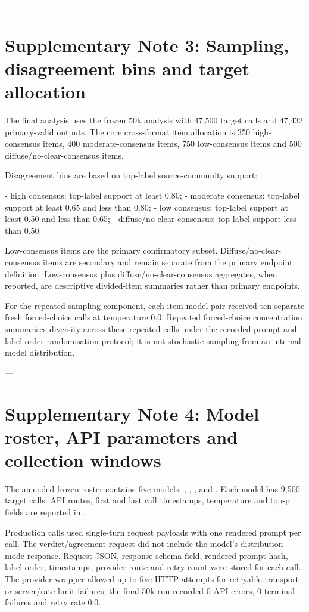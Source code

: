 \documentclass[11pt]{article}
\begin{document}
---

\section{Supplementary Note 3: Sampling, disagreement bins and target allocation}

The final analysis uses the frozen 50k analysis with 47,500 target calls and 47,432 primary-valid outputs. The core cross-format item allocation is 350 high-consensus items, 400 moderate-consensus items, 750 low-consensus items and 500 diffuse/no-clear-consensus items.

Disagreement bins are based on top-label source-community support:

- high consensus: top-label support at least 0.80;
- moderate consensus: top-label support at least 0.65 and less than 0.80;
- low consensus: top-label support at least 0.50 and less than 0.65;
- diffuse/no-clear-consensus: top-label support less than 0.50.

Low-consensus items are the primary confirmatory subset. Diffuse/no-clear-consensus items are secondary and remain separate from the primary endpoint definition. Low-consensus plus diffuse/no-clear-consensus aggregates, when reported, are descriptive divided-item summaries rather than primary endpoints.

For the repeated-sampling component, each item-model pair received ten separate fresh forced-choice calls at temperature 0.0. Repeated forced-choice concentration summarises diversity across these repeated calls under the recorded prompt and label-order randomisation protocol; it is not stochastic sampling from an internal model distribution.

---

\section{Supplementary Note 4: Model roster, API parameters and collection windows}

The amended frozen roster contains five models: , , ,  and . Each model has 9,500 target calls. API routes, first and last call timestamps, temperature and top-p fields are reported in .

Production calls used single-turn request payloads with one rendered prompt per call. The verdict/agreement request did not include the model's distribution-mode response. Request JSON, response-schema field, rendered prompt hash, label order, timestamps, provider route and retry count were stored for each call. The provider wrapper allowed up to five HTTP attempts for retryable transport or server/rate-limit failures; the final 50k run recorded 0 API errors, 0 terminal failures and retry rate 0.0.
\end{document}
